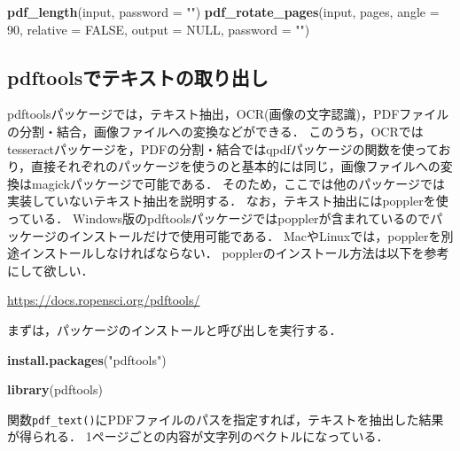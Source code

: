\documentclass[
]{article}
\newenvironment{Shaded}{\begin{snugshade}}{\end{snugshade}}
\newcommand{\AttributeTok}[1]{\textcolor[rgb]{0.13,0.29,0.53}{#1}}
\newcommand{\ConstantTok}[1]{\textcolor[rgb]{0.56,0.35,0.01}{#1}}
\newcommand{\DecValTok}[1]{\textcolor[rgb]{0.00,0.00,0.81}{#1}}
\newcommand{\FunctionTok}[1]{\textcolor[rgb]{0.13,0.29,0.53}{\textbf{#1}}}
\newcommand{\NormalTok}[1]{#1}
\newcommand{\StringTok}[1]{\textcolor[rgb]{0.31,0.60,0.02}{#1}}
\begin{document}
\begin{Shaded}
\begin{Highlighting}[]
\FunctionTok{pdf\_length}\NormalTok{(input, }\AttributeTok{password =} \StringTok{""}\NormalTok{)   }
\FunctionTok{pdf\_rotate\_pages}\NormalTok{(input, pages, }\AttributeTok{angle =} \DecValTok{90}\NormalTok{, }\AttributeTok{relative =} \ConstantTok{FALSE}\NormalTok{, }\AttributeTok{output =} \ConstantTok{NULL}\NormalTok{, }\AttributeTok{password =} \StringTok{""}\NormalTok{)   }
\end{Highlighting}
\end{Shaded}

\hypertarget{pdftools}{%
\subsection{pdftoolsでテキストの取り出し}\label{pdftools}}

pdftoolsパッケージでは，テキスト抽出，OCR(画像の文字認識)，PDFファイルの分割・結合，画像ファイルへの変換などができる．
このうち，OCRではtesseractパッケージを，PDFの分割・結合ではqpdfパッケージの関数を使っており，直接それぞれのパッケージを使うのと基本的には同じ，画像ファイルへの変換はmagickパッケージで可能である．
そのため，ここでは他のパッケージでは実装していないテキスト抽出を説明する．
なお，テキスト抽出にはpopplerを使っている．
Windows版のpdftoolsパッケージではpopplerが含まれているのでパッケージのインストールだけで使用可能である．
MacやLinuxでは，popplerを別途インストールしなければならない．
popplerのインストール方法は以下を参考にして欲しい．

\url{https://docs.ropensci.org/pdftools/}

まずは，パッケージのインストールと呼び出しを実行する．

\begin{Shaded}
\begin{Highlighting}[]
\FunctionTok{install.packages}\NormalTok{(}\StringTok{"pdftools"}\NormalTok{)}
\end{Highlighting}
\end{Shaded}

\begin{Shaded}
\begin{Highlighting}[]
\FunctionTok{library}\NormalTok{(pdftools)}
\end{Highlighting}
\end{Shaded}

関数\texttt{pdf\_text()}にPDFファイルのパスを指定すれば，テキストを抽出した結果が得られる．
1ページごとの内容が文字列のベクトルになっている．
\end{document}
